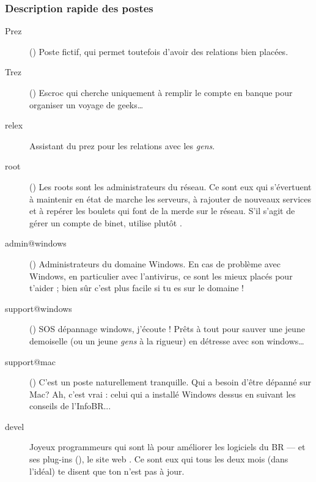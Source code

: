 \subsubsection*{Description rapide des postes}

\begin{description}

  \item[Prez]{() Poste fictif, qui permet toutefois d'avoir
des relations bien plac\'ees.}

  \item[Trez]{() Escroc qui cherche uniquement \`a remplir le compte en banque pour organiser un voyage de geeks\dots}

  \item[relex]{Assistant du prez pour les relations avec les \emph{gens}.}

  \item[root]{() Les roots sont les administrateurs du r\'eseau. Ce sont eux qui s'\'evertuent \`a maintenir en \'etat de marche les serveurs, \`a rajouter de nouveaux services et \`a rep\'erer les boulets qui font de la merde sur le r\'eseau. S'il s'agit de g\'erer un compte de binet, utilise plut\^ot .}

  \item[admin@windows] {() Administrateurs du domaine Windows. En cas de probl\`eme avec Windows, en particulier avec l'antivirus, ce sont les mieux plac\'es pour t'aider ; bien s\^ur c'est plus facile si tu es sur le domaine !
}
  \item[support@windows] {() SOS d\'epannage windows, j'\'ecoute ! Pr\^ets \`a tout pour sauver une jeune demoiselle (ou un jeune \emph{gens} \`a la rigueur) en d\'etresse avec son windows\dots }

  \item[support@mac] {() C'est un poste naturellement tranquille. Qui a besoin d'\^etre d\'epann\'e sur Mac? Ah, c'est vrai : celui qui a install\'e Windows dessus en suivant les conseils de l'InfoBR... }

  \item[devel]{Joyeux programmeurs qui sont l\`a pour am\'eliorer les logiciels du BR ---  et ses plug-ins (), le site web . Ce sont eux qui tous les deux mois (dans l'idéal) te disent que ton  n'est pas \`a jour.}


\end{description}
